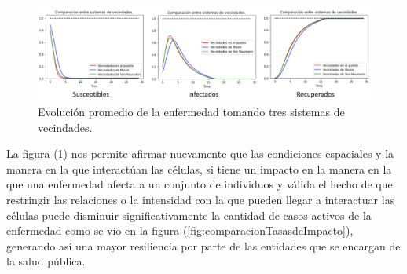 \newpage

\begin{figure}[h]
  \centering
    \includegraphics[width=1\textwidth]{Imagenes/comparacionSistemasVecindades.PNG}
    \caption{Evolución promedio de la enfermedad tomando tres sistemas de vecindades.}
    \label{fig:comparacionSistemasDeVecindades}
\end{figure}

La figura (\ref{fig:comparacionSistemasDeVecindades}) nos permite afirmar nuevamente que las condiciones espaciales y la manera en la que interactúan las células, si tiene un impacto en la manera en la que una enfermedad afecta a un conjunto de individuos y válida el hecho de que restringir las relaciones o la intensidad con la que pueden llegar a interactuar las células puede disminuir significativamente la cantidad de casos activos de la enfermedad como se vio en la figura (\ref{fig:comparacionTasasdeImpacto}), generando así una mayor resiliencia por parte de las entidades que se encargan de la salud pública.